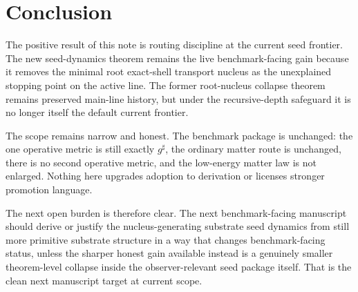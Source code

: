\documentclass[11pt]{article}
\newcommand{\CompletedMetric}{g^{\sharp}}
\begin{document}
\section{Conclusion}

The positive result of this note is routing discipline at the current seed frontier. The new seed-dynamics theorem remains the live benchmark-facing gain because it removes the minimal root exact-shell transport nucleus as the unexplained stopping point on the active line. The former root-nucleus collapse theorem remains preserved main-line history, but under the recursive-depth safeguard it is no longer itself the default current frontier.

The scope remains narrow and honest. The benchmark package is unchanged: the one operative metric is still exactly \(\CompletedMetric\), the ordinary matter route is unchanged, there is no second operative metric, and the low-energy matter law is not enlarged. Nothing here upgrades adoption to derivation or licenses stronger promotion language.

The next open burden is therefore clear. The next benchmark-facing manuscript should derive or justify the nucleus-generating substrate seed dynamics from still more primitive substrate structure in a way that changes benchmark-facing status, unless the sharper honest gain available instead is a genuinely smaller theorem-level collapse inside the observer-relevant seed package itself. That is the clean next manuscript target at current scope.
\end{document}
